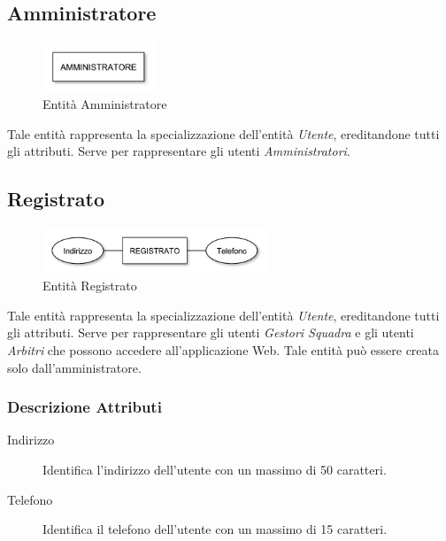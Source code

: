 	\subsection{Amministratore}
	
		\begin{figure}[h]
			\centering
			\includegraphics[width=0.3\textwidth]
			{immagini/02-amministratore}
			
			\caption{Entità Amministratore}
		\end{figure}
		
		Tale entità rappresenta la specializzazione dell'entità \emph{Utente}, ereditandone tutti gli attributi. Serve per rappresentare gli utenti \emph{Amministratori}.
	
	\subsection{Registrato}
	
		\begin{figure}[h]
			\centering
			\includegraphics[width=0.6\textwidth]
			{immagini/03-registrato}
			
			\caption{Entità Registrato}
		\end{figure}
		
		Tale entità rappresenta la specializzazione dell'entità \emph{Utente}, ereditandone tutti gli attributi. Serve per rappresentare gli utenti \emph{Gestori Squadra} e gli utenti \emph{Arbitri} che possono accedere all'applicazione Web. Tale entità può essere creata solo dall'amministratore.
		
		\subsubsection*{Descrizione Attributi}
		
		\begin{description}
			
			\item[Indirizzo]
			Identifica l'indirizzo dell'utente con un massimo di 50 caratteri.
			
			\item[Telefono]
			Identifica il telefono dell'utente con un massimo di 15 caratteri.
			
		\end{description}
		
